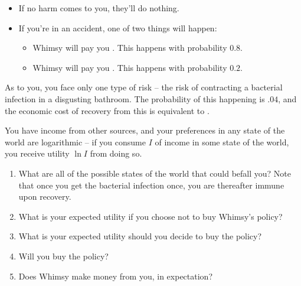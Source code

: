 \documentclass{article}
\begin{document}
\begin{itemize}
\item If no harm comes to you, they'll do nothing.
\item If you're in an accident, one of two things will happen:
\begin{itemize}
\item Whimsy will pay you . This happens with probability $0.8$.
\item Whimsy will pay you . This happens with probability $0.2$.
\end{itemize}
\end{itemize}

As to you, you face only one type of risk -- the risk of contracting a bacterial infection in a disgusting bathroom. The probability of this happening is $.04$, and the economic cost of recovery from this is equivalent to .

You have income  from other sources, and your preferences in any state of the world are logarithmic -- if you consume $I$ of income in some state of the world, you receive utility $\ln I$ from doing so.

\begin{enumerate}
\item What are all of the possible states of the world that could befall you? Note that once you get the bacterial infection once, you are thereafter immune upon recovery.

\item What is your expected utility if you choose not to buy Whimsy's policy?

\item What is your expected utility should you decide to buy the policy?

\item Will you buy the policy?

\item Does Whimsy make money from you, in expectation?
\end{enumerate}
\end{document}
